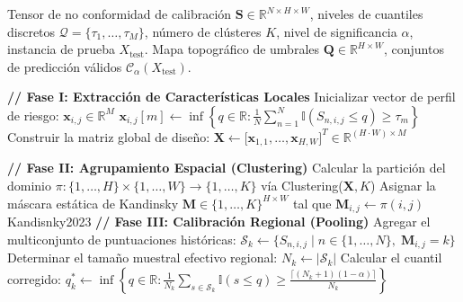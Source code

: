 \begin{algorithm}[H]
    \caption{Algoritmo de Kandinsky Conformal Prediction}
    \label{alg:kandinsky}
    \begin{algorithmic}[1]
        \REQUIRE Tensor de no conformidad de calibración $\mathbf{S} \in \mathbb{R}^{N \times H \times W}$, niveles de cuantiles discretos $\mathcal{Q} = \{\tau_1, \dots, \tau_M\}$, número de clústeres $K$, nivel de significancia $\alpha$, instancia de prueba $X_{\text{test}}$.
        \ENSURE Mapa topográfico de umbrales $\mathbf{Q} \in \mathbb{R}^{H \times W}$, conjuntos de predicción válidos $\mathcal{C}_{\alpha}(X_{\text{test}})$.

        \vspace{0.1cm}
        \STATE \textbf{// Fase I: Extracción de Características Locales}
            \STATE Inicializar vector de perfil de riesgo: $\mathbf{x}_{i,j} \in \mathbb{R}^M$
                \STATE $\mathbf{x}_{i,j}[m] \leftarrow \inf \left\{ q \in \mathbb{R} : \frac{1}{N} \sum_{n=1}^N \mathbb{I}(S_{n,i,j} \leq q) \geq \tau_m \right\}$
            \ENDFOR
        \ENDFOR
        \STATE Construir la matriz global de diseño: $\mathbf{X} \leftarrow \big[\mathbf{x}_{1,1}, \dots, \mathbf{x}_{H,W}\big]^T \in \mathbb{R}^{(H \cdot W) \times M}$

        \vspace{0.1cm}
        \STATE \textbf{// Fase II: Agrupamiento Espacial (Clustering)}
        \STATE Calcular la partición del dominio $\pi: \{1, \dots, H\} \times \{1, \dots, W\} \to \{1, \dots, K\}$ vía Clustering($\mathbf{X}, K$)
        \STATE Asignar la máscara estática de Kandinsky $\mathbf{M} \in \{1, \dots, K\}^{H \times W}$ tal que $\mathbf{M}_{i,j} \leftarrow \pi(i,j)$
Kandisnky2023
        \vspace{0.1cm}
        \STATE \textbf{// Fase III: Calibración Regional (Pooling)}
            \STATE Agregar el multiconjunto de puntuaciones históricas: $\mathcal{S}_k \leftarrow \Big\{ S_{n,i,j} \;\Big|\; n \in \{1, \dots, N\}, \; \mathbf{M}_{i,j} = k \Big\}$
            \STATE Determinar el tamaño muestral efectivo regional: $N_k \leftarrow |\mathcal{S}_k| $
            \STATE Calcular el cuantil corregido: $q_k^* \leftarrow \inf \left\{ q \in \mathbb{R} : \frac{1}{N_k} \sum_{s \in \mathcal{S}_k} \mathbb{I}(s \leq q) \geq \frac{\lceil (N_k + 1)(1 - \alpha) \rceil}{N_k} \right\}$
        \ENDFOR


\end{algorithmic}
\end{algorithm}

